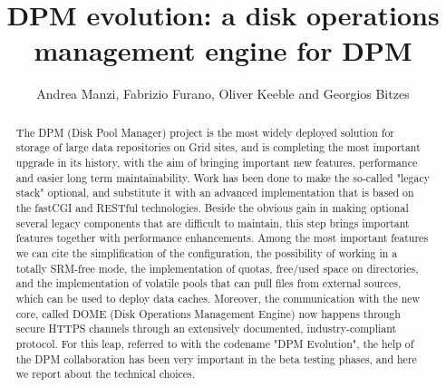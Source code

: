 \documentclass[a4paper]{jpconf}
\begin{document}
\title{
DPM evolution: a disk operations management engine for DPM}

\author{Andrea Manzi, Fabrizio Furano, Oliver Keeble and Georgios Bitzes}

\address{CERN IT}


\begin{abstract}
The DPM (Disk Pool Manager) project is the most widely deployed solution for storage of
large data repositories on Grid sites, and is completing the most important upgrade
in its history, with the aim of bringing important new features, performance
and easier long term maintainability.
Work has been done to make the so-called "legacy stack" optional, and substitute
it with an advanced implementation that is based on the fastCGI and RESTful technologies.
Beside the obvious gain in making optional several legacy components that
are difficult to maintain, this step brings important features together with
performance enhancements. Among the most important features we can cite the
simplification of the configuration, the possibility of working in a totally
SRM-free mode, the implementation of quotas, free/used space on directories,
and the implementation of volatile pools that can pull files from external
sources, which can be used to deploy data caches.
Moreover, the communication with the new core, called DOME
(Disk Operations Management Engine) now happens through secure HTTPS channels
through an extensively documented, industry-compliant protocol.
For this leap, referred to with the codename "DPM Evolution", the help of the
DPM collaboration has been very important in the beta testing phases,
and here we report about the technical choices.
\end{abstract}



\newpage %


\end{document}
